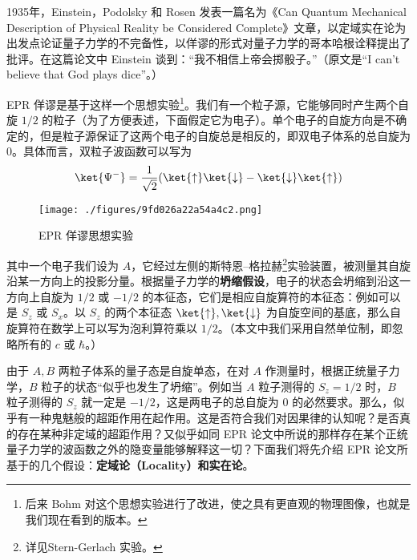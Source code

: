 
1935年，Einstein，Podolsky 和 Rosen 发表一篇名为《Can Quantum Mechanical Description of Physical Reality be Considered Complete》文章，以定域实在论为出发点论证量子力学的不完备性，以佯谬的形式对量子力学的哥本哈根诠释提出了批评。在这篇论文中 Einstein 谈到：“我不相信上帝会掷骰子。”（原文是“I can't believe that God plays dice”。） 

EPR 佯谬是基于这样一个思想实验\footnote{后来 Bohm 对这个思想实验进行了改进，使之具有更直观的物理图像，也就是我们现在看到的版本。}。我们有一个粒子源，它能够同时产生两个自旋 $1/2$ 的粒子（为了方便表述，下面假定它为电子）。单个电子的自旋方向是不确定的，但是粒子源保证了这两个电子的自旋总是相反的，即双电子体系的总自旋为 $0$。具体而言，双粒子波函数可以写为
\begin{equation}
\ket{\Psi^-}=\frac{1}{\sqrt{2}}(\ket{\uparrow}\ket{\downarrow}-\ket{\downarrow}\ket{\uparrow})
\end{equation}

\begin{figure}[ht]
\centering
\texttt{[image: ./figures/9fd026a22a54a4c2.png]}
\caption{EPR 佯谬思想实验} \label{fig_EPR_1}
\end{figure}

其中一个电子我们设为 $A$，它经过左侧的斯特恩–格拉赫\footnote{详见Stern-Gerlach 实验。}实验装置，被测量其自旋沿某一方向上的投影分量。根据量子力学的\textbf{坍缩假设}，电子的状态会坍缩到沿这一方向上自旋为 $1/2$ 或 $-1/2$ 的本征态，它们是相应自旋算符的本征态：例如可以是 $S_z$ 或 $S_x$。以 $S_z$ 的两个本征态 $\ket{\uparrow},\ket{\downarrow}$ 为自旋空间的基底，那么自旋算符在数学上可以写为泡利算符乘以 $1/2$。（本文中我们采用自然单位制，即忽略所有的 $c$ 或 $\hbar$。）

由于 $A,B$ 两粒子体系的量子态是自旋单态，在对 $A$ 作测量时，根据正统量子力学，$B$ 粒子的状态“似乎也发生了坍缩”。例如当 $A$ 粒子测得的 $S_z=1/2$ 时，$B$ 粒子测得的 $S_z$ 就一定是 $-1/2$，这是两电子的总自旋为 $0$ 的必然要求。那么，似乎有一种鬼魅般的超距作用在起作用。这是否符合我们对因果律的认知呢？是否真的存在某种非定域的超距作用？又似乎如同 EPR 论文中所说的那样存在某个正统量子力学的波函数之外的隐变量能够解释这一切？下面我们将先介绍 EPR 论文所基于的几个假设：\textbf{定域论（Locality）和实在论}。

